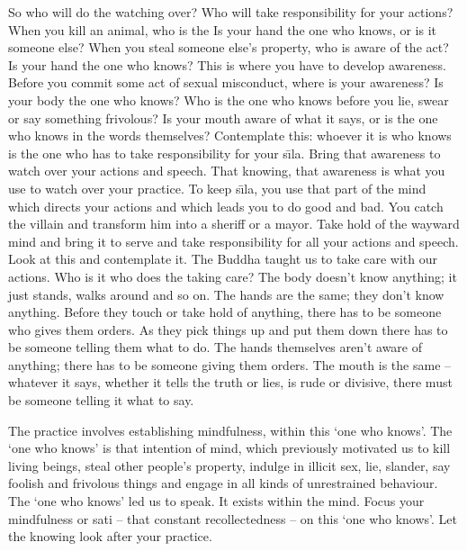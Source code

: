 So who will do the watching over? Who will take responsibility for your actions? When you kill an animal, who is the  Is your hand the one who knows, or is it someone else? When you steal someone else's property, who is aware of the act? Is your hand the one who knows? This is where you have to develop awareness. Before you commit some act of sexual misconduct, where is your awareness? Is your body the one who knows? Who is the one who knows before you lie, swear or say something frivolous? Is your mouth aware of what it says, or is the one who knows in the words themselves? Contemplate this: whoever it is who knows is the one who has to take responsibility for your s\={\i}la. Bring that awareness to watch over your actions and speech. That knowing, that awareness is what you use to watch over your practice. To keep s\={\i}la, you use that part of the mind which directs your actions and which leads you to do good and bad. You catch the villain and transform him into a sheriff or a mayor. Take hold of the wayward mind and bring it to serve and take responsibility for all your actions and speech. Look at this and contemplate it. The Buddha taught us to take care with our actions. Who is it who does the taking care? The body doesn't know anything; it just stands, walks around and so on. The hands are the same; they don't know anything. Before they touch or take hold of anything, there has to be someone who gives them orders. As they pick things up and put them down there has to be someone telling them what to do. The hands themselves aren't aware of anything; there has to be someone giving them orders. The mouth is the same -- whatever it says, whether it tells the truth or lies, is rude or divisive, there must be someone telling it what to say.

The practice involves establishing  mindfulness, within this `one who knows'. The `one who knows' is that intention of mind, which previously motivated us to kill living beings, steal other people's property, indulge in illicit sex, lie, slander, say foolish and frivolous things and engage in all kinds of unrestrained behaviour. The `one who knows' led us to speak. It exists within the mind. Focus your mindfulness or sati -- that constant recollectedness -- on this `one who knows'. Let the knowing look after your practice.

